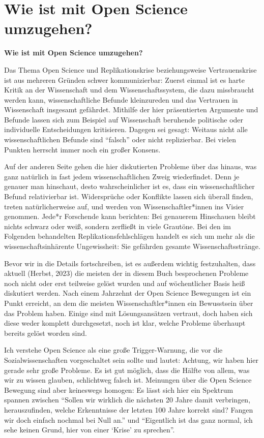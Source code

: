 \documentclass[
  letterpaper,
  DIV=11,
  numbers=noendperiod]{scrreprt}
\begin{document}
\chapter{Wie ist mit Open Science
umzugehen?}\label{wie-ist-mit-open-science-umzugehen}

\textbf{Wie ist mit Open Science umzugehen?}

Das Thema Open Science und Replikationskrise beziehungsweise
Vertrauenskrise ist aus mehreren Gründen schwer kommunizierbar: Zuerst
einmal ist es harte Kritik an der Wissenschaft und dem
Wissenschaftssystem, die dazu missbraucht werden kann, wissenschaftliche
Befunde kleinzureden und das Vertrauen in Wissenschaft insgesamt
gefährdet. Mithilfe der hier präsentierten Argumente und Befunde lassen
sich zum Beispiel auf Wissenschaft beruhende politische oder
individuelle Entscheidungen kritisieren. Dagegen sei gesagt: Weitaus
nicht alle wissenschaftlichen Befunde sind ``falsch'' oder nicht
replizierbar. Bei vielen Punkten herrscht immer noch ein großer Konsens.

Auf der anderen Seite gehen die hier diskutierten Probleme über das
hinaus, was ganz natürlich in fast jedem wissenschaftlichen Zweig
wiederfindet. Denn je genauer man hinschaut, desto wahrscheinlicher ist
es, dass ein wissenschaftlicher Befund relativierbar ist. Widersprüche
oder Konflikte lassen sich überall finden, treten natürlicherweise auf,
und werden von Wissenschaftler*innen ins Visier genommen. Jede*r
Forschende kann berichten: Bei genauerem Hinschauen bleibt nichts
schwarz oder weiß, sondern zerfließt in viele Grautöne. Bei den im
Folgenden behandelten Replikationsfehlschlägen handelt es sich um mehr
als die wissenschaftsinhärente Ungewissheit: Sie gefährden gesamte
Wissenschaftsstränge.

Bevor wir in die Details fortschreiben, ist es außerdem wichtig
festzuhalten, dass aktuell (Herbst, 2023) die meisten der in diesem Buch
besprochenen Probleme noch nicht oder erst teilweise gelöst wurden und
auf wöchentlicher Basis heiß diskutiert werden. Nach einem Jahrzehnt der
Open Science Bewegungen ist ein Punkt erreicht, an dem die meisten
Wissenschaftler*innen ein Bewusstsein über das Problem haben. Einige
sind mit Lösungsansätzen vertraut, doch haben sich diese weder komplett
durchgesetzt, noch ist klar, welche Probleme überhaupt bereits gelöst
worden sind.

Ich verstehe Open Science als eine große Trigger-Warnung, die vor die
Sozialwissenschaften vorgeschaltet sein sollte und lautet: Achtung, wir
haben hier gerade sehr große Probleme. Es ist gut möglich, dass die
Hälfte von allem, was wir zu wissen glauben, schlichtweg falsch ist.
Meinungen über die Open Science Bewegung sind aber keineswegs homogen:
Es lässt sich hier ein Spektrum spannen zwischen ``Sollen wir wirklich
die nächsten 20 Jahre damit verbringen, herauszufinden, welche
Erkenntnisse der letzten 100 Jahre korrekt sind? Fangen wir doch einfach
nochmal bei Null an.'' und ``Eigentlich ist das ganz normal, ich sehe
keinen Grund, hier von einer `Krise' zu sprechen''.
\end{document}
